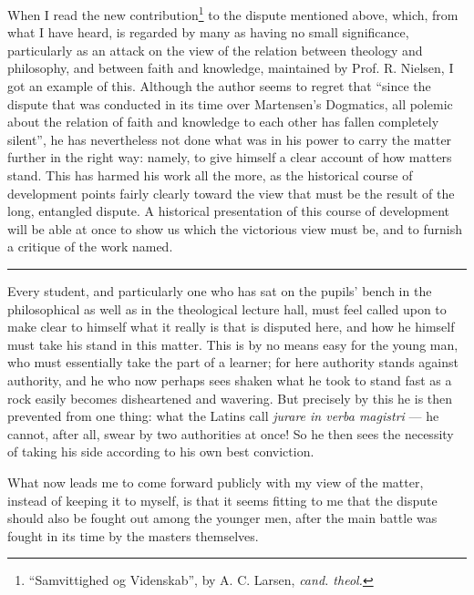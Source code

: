 \documentclass[12pt,a4paper]{book}
\newcommand{\opage}[1]{\marginnote{\footnotesize\textit{[#1]}}}
\begin{document}
\opage{4}\setcounter{footnote}{0}%
When I read the new contribution\footnote{``Samvittighed og Videnskab'', by A. C. Larsen, \textit{cand. theol.}} to the dispute mentioned above,
which, from what I have heard, is regarded by many as having
no small significance, particularly as an attack on the
view of the relation between theology and philosophy, and
between faith and knowledge, maintained by Prof. R. Nielsen,
I got an example of this. Although the author seems to regret that ``since the
dispute that was conducted in its time over Martensen's Dogmatics, all
polemic about the relation of faith and knowledge to each other has
fallen completely silent'', he has nevertheless not done what was in his
power to carry the matter further in the right way: namely,
to give himself a clear account of how matters stand. This
has harmed his work all the more, as the historical
course of development points fairly clearly toward the view that
must be the result of the long, entangled dispute. A historical
presentation of this course of development will be able at once
to show us which the victorious view must be, and
to furnish a critique of the work named.

\begin{center}\rule{4em}{0.4pt}\end{center}

Every student, and particularly one who has sat
on the pupils' bench in the philosophical as well as in the theological
lecture hall, must feel called upon to make clear to himself
what it really is that is disputed here, and how he himself
must take his stand in this matter. This is by no means easy for the
young man, who must essentially take the part of a learner; for here
authority stands against authority, and he who now perhaps sees shaken
what he took to stand fast as a rock easily becomes
disheartened and wavering. But precisely by this he is then
prevented from one thing: what the Latins call \textit{jurare in verba magistri} ---
he cannot, after all, swear by two authorities at once! So
he then sees the necessity of taking his side according to his own
best conviction.

\opage{5}\setcounter{footnote}{0}%
What now leads me to come forward publicly with my
view of the matter, instead of keeping it to myself,
is that it seems fitting to me that the dispute should also be fought out
among the younger men, after the main battle was fought in its time by the
masters themselves.
\end{document}
